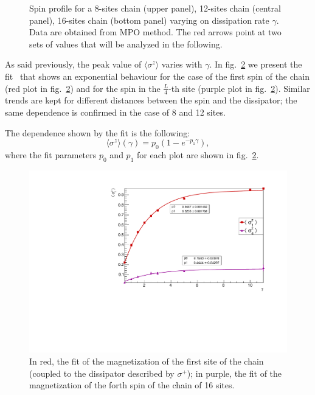\begin{figure}[H]
    \label{fig:16sites_LMvsGamma}
\captionsetup{width=1.\linewidth}
\caption{Spin profile for a 8-sites chain (upper panel), 12-sites chain (central panel), 16-sites chain (bottom panel) varying on dissipation rate $\gamma$. Data are obtained from MPO method. The red arrows point at two sets of values that will be analyzed in the following.}
\label{fig:LMvsGamma3panelsSizes}
\end{figure}

As said previously, the peak value of $\langle\sigma^z\rangle$ varies with $\gamma$. In fig.~\ref{fig:LM_PeakAnd4th_vsGamma} we present the fit~\cite{root_cern} that shows an exponential behaviour for the case of the first spin of the chain (red plot in fig.~\ref{fig:LM_PeakAnd4th_vsGamma}) and for the spin in the $\frac{L}{4}$-th site (purple plot in fig.~\ref{fig:LM_PeakAnd4th_vsGamma}). Similar trends are kept for different distances between the spin and the dissipator; the same dependence is confirmed in the case of 8 and 12 sites.

The dependence shown by the fit is the following:
\begin{equation}
    \langle \sigma^z \rangle(\gamma) = p_0 (1- e^{-p_1\gamma}),
\end{equation}
where the fit parameters $p_0$ and $p_1$ for each plot are shown in fig.~\ref{fig:LM_PeakAnd4th_vsGamma}.

\begin{figure}[H]
\centering
\includegraphics[scale = 0.6]{Figures/LMvsGammaVsSiteIndex.pdf}
\captionsetup{width=1.\linewidth}
\caption{In red, the fit of the magnetization of the first site of the chain (coupled to the dissipator described by $\sigma^+$); in purple, the fit of the magnetization of the forth spin of the chain of 16 sites.}
\label{fig:LM_PeakAnd4th_vsGamma}
\end{figure}

